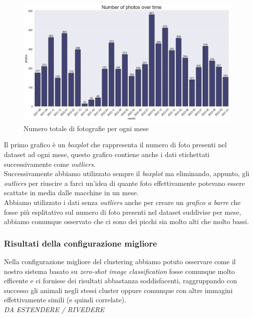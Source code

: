 \documentclass[12pt,a4paper,twoside]{article}
\begin{document}
\begin{figure}[h!]
    \centering
    \includegraphics[width=\textwidth, height=\textheight, keepaspectratio]{assets/photos-ot.png}
    \caption{Numero totale di fotografie per ogni mese}
    \label{fig:photos-ot}
\end{figure}
Il primo grafico è un \textit{boxplot} che rappresenta il numero di foto presenti nel dataset ad 
ogni mese, questo grafico contiene anche i dati etichettati successivamente come 
\textit{outliers}.\\ 
Successivamente abbiamo utilizzato sempre il \textit{boxplot} ma eliminando, appunto, gli 
\textit{outliers} per riuscire a farci un'idea di quante foto effettivamente potevano essere 
scattate in media dalle macchine in un mese.\\
Abbiamo utilizzato i dati senza \textit{outliers} anche per creare un \textit{grafico a barre} 
che fosse più esplitativo sul numero di foto presenti nel dataset suddivise per mese, abbiamo 
comunque osservato che ci sono dei picchi sia molto alti che molto bassi.


\subsubsection{Risultati della configurazione migliore}
Nella configurazione migliore del clustering abbiamo potuto osservare come il nostro sistema 
basato su \textit{zero-shot image classification} fosse comunque molto efficente e ci fornisse 
dei risultati abbastanza soddisfacenti, raggruppando con successo gli animali negli stessi cluster 
oppure comunque con altre immagini effettivamente simili (e quindi correlate).\\ 
\textit{DA ESTENDERE / RIVEDERE}
\end{document}
